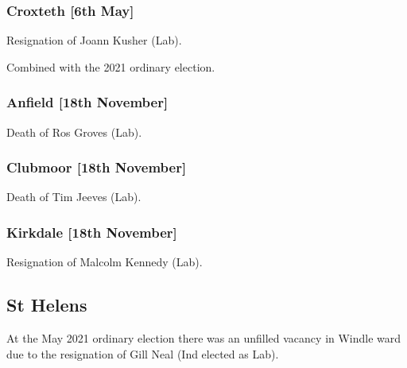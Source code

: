 \documentclass[a4paper,openany]{book}
\begin{document}
\begin{resultsiii}
\subsubsection*{Croxteth \hspace*{\fill}\nolinebreak[1]%
	\enspace\hspace*{\fill}
	[6th May]}


Resignation of Joann Kusher (Lab).

Combined with the 2021 ordinary election.

\subsubsection*{Anfield \hspace*{\fill}\nolinebreak[1]%
	\enspace\hspace*{\fill}
	[18th November]}


Death of Ros Groves (Lab).

\subsubsection*{Clubmoor \hspace*{\fill}\nolinebreak[1]%
	\enspace\hspace*{\fill}
	[18th November]}


Death of Tim Jeeves (Lab).

\subsubsection*{Kirkdale \hspace*{\fill}\nolinebreak[1]%
	\enspace\hspace*{\fill}
	[18th November]}


Resignation of Malcolm Kennedy (Lab).

\subsection*{St Helens}

At the May 2021 ordinary election there was an unfilled vacancy in Windle ward due to the resignation of Gill Neal (Ind elected as Lab).


\end{resultsiii}
\end{document}
